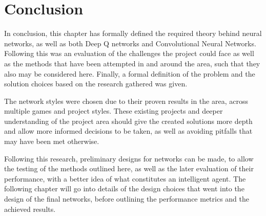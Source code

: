 \section{Conclusion}

In conclusion, this chapter has formally defined the required theory behind
neural networks, as well as both Deep Q networks and Convolutional Neural
Networks. Following this was an evaluation of the challenges the project could
face as well as the methods that have been attempted in and around the area,
such that they also may be considered here. Finally, a formal definition of the
problem and the solution choices based on the research gathered was given.

The network styles were chosen due to their proven results in the area, across
multiple games and project styles. These existing projects and deeper
understanding of the project area should give the created solutions more depth
and allow more informed decisions to be taken, as well as avoiding pitfalls that
may have been met otherwise.

Following this research, preliminary designs for networks can be made, to allow
the testing of the methods outlined here, as well as the later evaluation of
their performance, with a better idea of what constitutes an intelligent agent.
The following chapter will go into details of the design choices that went into
the design of the final networks, before outlining the performance metrics and
the achieved results.
